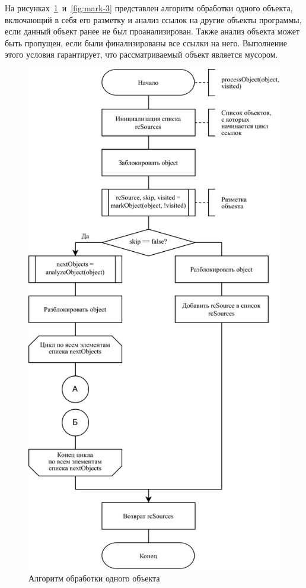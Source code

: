 На рисунках~\ref{fig:mark-2}~и~\ref{fig:mark-3} представлен алгоритм обработки одного объекта, включающий в себя его разметку и анализ ссылок на другие объекты программы, если данный объект ранее не был проанализирован. Также анализ объекта может быть пропущен, если были финализированы все ссылки на него. Выполнение этого условия гарантирует, что рассматриваемый объект является мусором.

\begin{figure}[H]
	\centering
	\includegraphics[scale=0.185]{assets/mark-2.png}
	\caption{Алгоритм обработки одного объекта}
	\label{fig:mark-2}
\end{figure}


